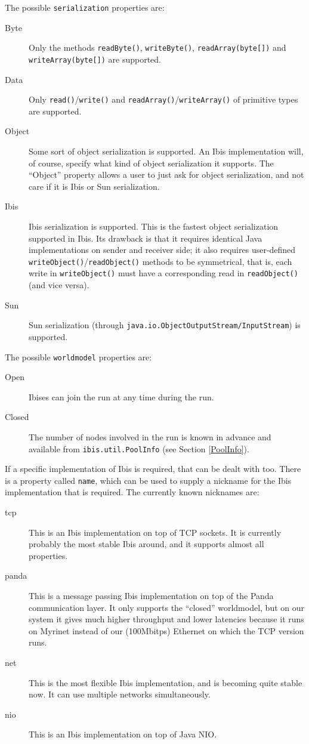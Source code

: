 \documentclass[10pt]{article}
\newcommand{\remark}[1]{[\emph{#1}]}
\begin{document}
The possible \texttt{serialization} properties are:
\begin{description}
\item[Byte]
Only the methods \texttt{readByte()}, \texttt{writeByte()}, \texttt{readArray(byte[])} and \texttt{writeArray(byte[])} are supported.
\item[Data]
Only \texttt{read()}/\texttt{write()} and \texttt{readArray()}/\texttt{writeArray()} of primitive types are supported.
\item[Object]
Some sort of object serialization is supported. An Ibis implementation
will, of course, specify what kind of object serialization it supports.
The ``Object'' property allows a user to just ask for object
serialization, and not care if it is Ibis or Sun serialization.
\item[Ibis]
Ibis serialization is supported.
This is the fastest object serialization supported in Ibis. Its drawback
is that it requires identical Java implementations on sender and
receiver side; 
it also requires user-defined
\texttt{writeObject()}/\texttt{readObject()} methods to be symmetrical, that is,
each write in \texttt{writeObject()} must have a corresponding read
in \texttt{readObject()} (and vice versa).
\item[Sun]
Sun serialization (through \texttt{java.io.ObjectOutputStream/InputStream}) is
supported.
\end{description}

\noindent
The possible \texttt{worldmodel} properties are:
\begin{description}
\item[Open]
Ibises can join the run at any time during the run.
\item[Closed]
The number of nodes involved in the run is known in advance and
available from \texttt{ibis.util.PoolInfo} (see Section \ref{PoolInfo}).
\end{description}

\noindent
If a specific implementation of Ibis is required, that can be dealt with too.
There is a property called \texttt{name}, which can be used to supply a nickname
for the Ibis implementation that is required.
The currently known nicknames are:
\begin{description}
\item[tcp]
This is an Ibis implementation on top of TCP sockets. It is currently 
probably the most stable Ibis around, and it supports almost all properties.
\item[panda]
This is a message passing Ibis implementation on top of the Panda
communication layer. It only supports the ``closed'' worldmodel,
but on our system it gives much higher throughput and lower latencies
because it runs on Myrinet instead of our (100Mbitps) Ethernet on which
the TCP version runs.
\item[net]
This is the most flexible Ibis implementation, and is becoming quite
stable now. It can use multiple networks simultaneously.
\item[nio]
This is an Ibis implementation on top of Java NIO.
\end{description}
\end{document}
